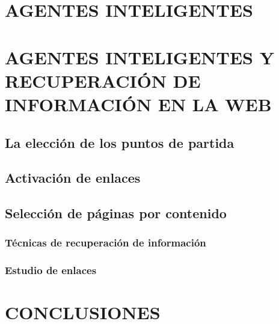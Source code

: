 \documentclass{beamer}
\begin{document}
\section{AGENTES INTELIGENTES}



\section{AGENTES INTELIGENTES Y RECUPERACI\'ON DE INFORMACI\'ON EN LA WEB}
\frame{
\transdissolve[duration=0.2]
\frametitle{}
}


\subsection{La elecci\'on de los puntos de partida}
\frame{
\transdissolve[duration=0.2]
\frametitle{}
}


\subsection{Activaci\'on de enlaces}
\frame{
\transdissolve[duration=0.2]
\frametitle{}
}


\subsection{Selecci\'on de p\'aginas por contenido}
\frame{
\transdissolve[duration=0.2]
\frametitle{}
}

\subsubsection{T\'ecnicas de recuperaci\'on de informaci\'on}
\frame{
\transdissolve[duration=0.2]
\frametitle{}
}

\subsubsection{Estudio de enlaces}
\frame{
\transdissolve[duration=0.2]
\frametitle{}
}



\section{CONCLUSIONES}
\frame{
\transdissolve[duration=0.2]
\frametitle{}
}
\end{document}
